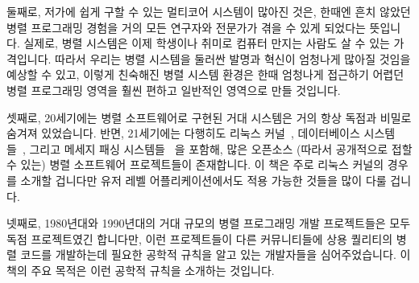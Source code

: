 둘째로, 저가에 쉽게 구할 수 있는 멀티코어 시스템이 많아진 것은, 한때엔 흔치
않았던 병렬 프로그래밍 경험을 거의 모든 연구자와 전문가가 겪을 수 있게 되었다는
뜻입니다.
실제로, 병렬 시스템은 이제 학생이나 취미로 컴퓨터 만지는 사람도 살
수 있는 가격입니다.
따라서 우리는 병렬 시스템을 둘러싼 발명과 혁신이 엄청나게 많아질 것임을 예상할
수 있고, 이렇게 친숙해진 병렬 시스템 환경은 한때 엄청나게 접근하기 어렵던 병렬
프로그래밍 영역을 훨씬 편하고 일반적인 영역으로 만들 것입니다.

셋째로, 20세기에는 병렬 소프트웨어로 구현된 거대 시스템은 거의 항상 독점과
비밀로 숨겨져 있었습니다.
반면, 21세기에는 다행히도 리눅스
커널~\cite{Torvalds2.6kernel}, 데이터베이스
시스템들~\cite{PostgreSQL2008,MySQL2008}, 그리고 메세지 패싱
시스템들~\cite{OpenMPI2008,BOINC2008} 을 포함해, 많은 오픈소스 (따라서
공개적으로 접할 수 있는) 병렬 소프트웨어 프로젝트들이 존재합니다.
이 책은 주로 리눅스 커널의 경우를 소개할 겁니다만 유저 레벨 어플리케이션에서도
적용 가능한 것들을 많이 다룰 겁니다.

넷째로, 1980년대와 1990년대의 거대 규모의 병렬 프로그래밍 개발 프로젝트들은
모두 독점 프로젝트였긴 합니다만, 이런 프로젝트들이 다른 커뮤니티들에 상용
퀄리티의 병렬 코드를 개발하는데 필요한 공학적 규칙을 알고 있는 개발자들을
심어주었습니다.
이 책의 주요 목적은 이런 공학적 규칙을 소개하는 것입니다.
\iffalse

